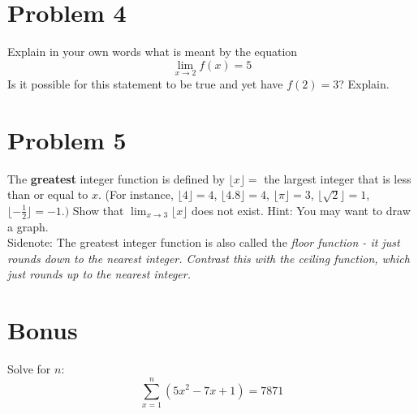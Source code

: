 \documentclass[11pt]{article}
\theoremstyle{definition}
\theoremstyle{remark}
\begin{document}
\section*{Problem 4}
Explain in your own words what is meant by the equation
\[\lim_{x\to 2} f(x) = 5\]
Is it possible for this statement to be true and yet have $f(2) = 3$? Explain.\\[5pt]

\section*{Problem 5}
The \textbf{greatest} integer function is defined by $\lfloor x \rfloor=$ the largest integer that is less than or equal to $x$. (For instance, $\lfloor 4 \rfloor=4$, $\lfloor 4.8 \rfloor=4$, $\lfloor \pi \rfloor=3$, $\lfloor \sqrt{2} \rfloor=1$, $\lfloor -\frac{1}{2} \rfloor= -1.)$ Show that $\lim_{x \to 3} \lfloor x \rfloor $ does not exist. Hint: You may want to draw a graph. \\[5pt]
Sidenote: The greatest integer function is also called the \em floor \em function - it just rounds down to the nearest integer. Contrast this with the \em ceiling \em function, which just rounds up to the nearest integer. 


\section*{Bonus}
Solve for $n$:
$$\sum_{x=1}^{n} (5x^2 -7x + 1) = 7871 $$
\end{document}
